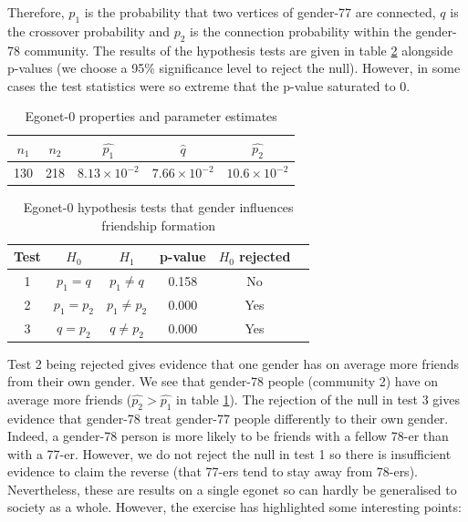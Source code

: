 \documentclass[]{article}
\begin{document}
Therefore, $p_1$ is the probability that two vertices of gender-77 are connected, $q$ is the crossover probability and $p_2$ is the connection probability within the gender-78 community. The results of the hypothesis tests are given in table \ref{tab:egonet-0-hyp-tests} alongside p-values (we choose a 95\% significance level to reject the null). However, in some cases the test statistics were so extreme that the p-value saturated to 0.
%
\begin{table}[!h]
	\centering
	\begin{tabular}{c c c c c}
		$n_1$                & $n_2$                & $\hat{p_1}$ & $\hat{q}$ & $\hat{p_2}$       \\ \hline
		130 & 218 & $8.13 \times 10^{-2}$ & $7.66 \times 10^{-2}$ & $10.6 \times 10^{-2}$
	\end{tabular}
	\caption{Egonet-0 properties and parameter estimates}
	\label{tab:egonet-0-props}
\end{table}

\begin{table}[!h]
	\centering
	\begin{tabular}{cccccc}
		Test & $H_0$                & $H_1$                & p-value & $H_0$ rejected       \\ \hline
		1    & $p_1 = q$            & $p_1 \neq q$         & 0.158 &  No                \\
		2    & $p_1 = p_2$ & $p_1 \neq p_2$ & 0.000 & Yes \\
		3    & $q = p_2$ & $q \neq p_2$ &  0.000 & Yes
	\end{tabular}
	\caption{Egonet-0 hypothesis tests that gender influences friendship formation}
	\label{tab:egonet-0-hyp-tests}
\end{table}

Test 2 being rejected gives evidence that one gender has on average more friends from their own gender. We see that gender-78 people (community 2) have on average more friends ($\hat{p_2} > \hat{p_1}$ in table \ref{tab:egonet-0-props}). The rejection of the null in test 3 gives evidence that gender-78 treat gender-77 people differently to their own gender. Indeed, a gender-78 person is more likely to be friends with a fellow 78-er than with a 77-er. However, we do not reject the null in test 1 so there is insufficient evidence to claim the reverse (that 77-ers tend to stay away from 78-ers). Nevertheless, these are results on a single egonet so can hardly be generalised to society as a whole. However, the exercise has highlighted some interesting points:
\end{document}
